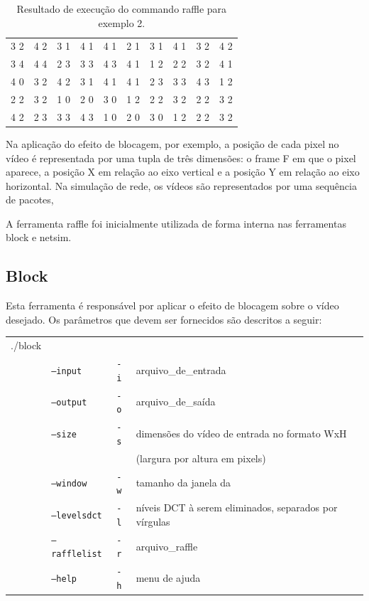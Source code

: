 \begin{table}[!h]
	\centering
	\caption{Resultado de execução do commando raffle para exemplo 2.}
	\label{tab:raffleresult2}
	\begin{tabular}{|l|l|l|l|l|l|l|l|l|l|}
		\hline
		3 2 & 4 2 & 3 1 & 4 1 & 4 1 & 2 1 & 3 1 & 4 1 & 3 2 & 4 2 \\
		3 4 & 4 4 & 2 3 & 3 3 & 4 3 & 4 1 & 1 2 & 2 2 & 3 2 & 4 1 \\
		4 0 & 3 2 & 4 2 & 3 1 & 4 1 & 4 1 & 2 3 & 3 3 & 4 3 & 1 2 \\
		2 2 & 3 2 & 1 0 & 2 0 & 3 0 & 1 2 & 2 2 & 3 2 & 2 2 & 3 2 \\
		4 2 & 2 3 & 3 3 & 4 3 & 1 0 & 2 0 & 3 0 & 1 2 & 2 2 & 3 2 \\
		\hline
	\end{tabular}
\end{table}

Na aplicação do efeito de blocagem, por exemplo, a posição de cada pixel no vídeo é representada por uma tupla de três dimensões: o frame F em que o pixel aparece, a posição X em relação ao eixo vertical e a posição Y em relação ao eixo horizontal. Na simulação de rede, os vídeos são representados por uma sequência de pacotes,

A ferramenta raffle foi inicialmente utilizada de forma interna nas ferramentas block e netsim. %

\subsection{Block}

Esta ferramenta é responsável por aplicar o efeito de blocagem sobre o vídeo desejado. Os parâmetros que devem ser fornecidos são descritos a seguir:

\begin{table}[!h]
	\begin{tabular}{llll}
	./block & & \\ 
	& \texttt{--input} & \texttt{-i}  & arquivo\_de\_entrada \\
	& \texttt{--output} & \texttt{-o}  & arquivo\_de\_saída \\
	& \texttt{--size} & \texttt{-s}  & dimensões do vídeo de entrada no formato WxH \\ 
	& & & (largura por altura em pixels) \\
	& \texttt{--window} & \texttt{-w}  & tamanho da janela da \sigla{DCT}{Discrete Cosine Transform} \\
	& \texttt{--levelsdct} & \texttt{-l}  & níveis DCT à serem eliminados, separados por vírgulas \\
	& \texttt{--rafflelist} & \texttt{-r}  & arquivo\_raffle \\
	& \texttt{--help} & \texttt{-h}  & menu de ajuda \\
	\end{tabular}
\end{table}

